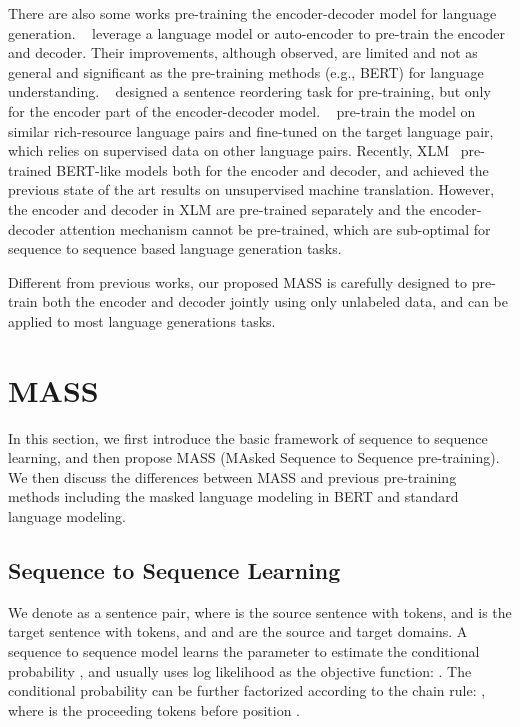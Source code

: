 \documentclass{article}
\begin{document}
	There are also some works pre-training the encoder-decoder model for language generation. ~\citet{dai2015semi,ramachandran2016unsupervised} leverage a language model or auto-encoder to pre-train the encoder and decoder. Their improvements, although observed, are limited and not as general and significant as the pre-training methods (e.g., BERT) for language understanding. ~\citet{zhang2016exploiting} designed a sentence reordering task for pre-training, but only for the encoder part of the encoder-decoder model. ~\citet{zoph2016transfer,firat2016zero} pre-train the model on similar rich-resource language pairs and fine-tuned on the target language pair, which relies on supervised data on other language pairs. Recently, XLM~\citep{Lample2019MLM} pre-trained BERT-like models both for the encoder and decoder, and achieved the previous state of the art results on unsupervised machine translation. However, the encoder and decoder in XLM are pre-trained separately and the encoder-decoder attention mechanism cannot be pre-trained, which are sub-optimal for sequence to sequence based language generation tasks.
	
	Different from previous works, our proposed MASS is carefully designed to pre-train both the encoder and decoder jointly using only unlabeled data, and can be applied to most language generations tasks.  
	
	\section{MASS}
	\label{sec_method}
	In this section, we first introduce the basic framework of sequence to sequence learning, and then propose MASS (MAsked Sequence to Sequence pre-training). We then discuss the differences between MASS and previous pre-training methods including the masked language modeling in BERT and standard language modeling.
	
	\subsection{Sequence to Sequence Learning}
	We denote  as a sentence pair, where  is the source sentence with  tokens, and  is the target sentence with  tokens, and  and  are the source and target domains. A sequence to sequence model learns the parameter  to estimate the conditional probability , and usually uses log likelihood as the objective function: . The conditional probability  can be further factorized according to the chain rule: , where  is the proceeding tokens before position . 
	
\end{document}
